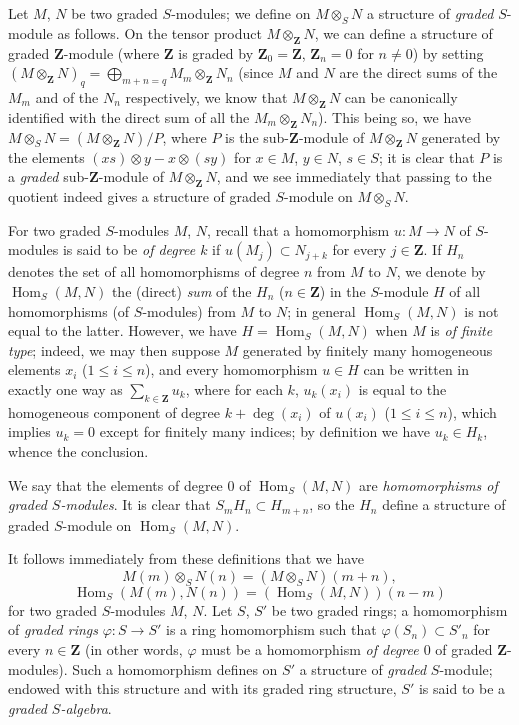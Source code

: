 \begin{env}[2.1.2]
\label{II.2.1.2}
Let $M$, $N$ be two graded $S$-modules; we define on $M\otimes_S N$ a
structure of \emph{graded} $S$-module as follows. On the tensor product
$M\otimes_{\mathbf{Z}}N$, we can define a structure of graded
$\mathbf{Z}$-module (where $\mathbf{Z}$ is graded by
$\mathbf{Z}_0=\mathbf{Z}$, $\mathbf{Z}_n=0$ for $n\ne0$) by setting $(M\otimes_{\mathbf{Z}}N)_q=\bigoplus_{m+n=q}M_m\otimes_{\mathbf{Z}}N_n$
(since $M$ and $N$ are the direct sums of the $M_m$ and of the $N_n$
respectively, we know that $M\otimes_{\mathbf{Z}}N$ can be canonically
identified with the direct sum of all the
$M_m\otimes_{\mathbf{Z}}N_n$). This being so, we have
$M\otimes_S N=(M\otimes_{\mathbf{Z}}N)/P$, where $P$ is the
sub-$\mathbf{Z}$-module of $M\otimes_{\mathbf{Z}}N$ generated by the
elements $(xs)\otimes y-x\otimes(sy)$ for $x\in M$, $y\in N$, $s\in S$;
it is clear that $P$ is a \emph{graded} sub-$\mathbf{Z}$-module of
$M\otimes_{\mathbf{Z}}N$, and we see immediately that passing to the
quotient indeed gives a structure of graded $S$-module on $M\otimes_S N$.

For two graded $S$-modules $M$, $N$, recall that a homomorphism
$u:M\to N$ of $S$-modules is said to be \emph{of degree $k$} if
$u(M_j)\subset N_{j+k}$ for every $j\in\mathbf{Z}$. If $H_n$ denotes the
set of all homomorphisms of degree $n$ from $M$ to $N$, we denote by
$\operatorname{Hom}_S(M,N)$ the (direct) \emph{sum} of the $H_n$
($n\in\mathbf{Z}$) in the $S$-module $H$ of all homomorphisms (of
$S$-modules) from $M$ to $N$; in general $\operatorname{Hom}_S(M,N)$ is not
equal to the latter. However, we have $H=\operatorname{Hom}_S(M,N)$ when
$M$ is \emph{of finite type}; indeed, we may then suppose $M$ generated by
finitely many homogeneous elements $x_i$ ($1\leq i\leq n$), and every
homomorphism $u\in H$ can be written in exactly one way as
$\sum_{k\in\mathbf{Z}}u_k$, where for each $k$, $u_k(x_i)$ is equal to the
homogeneous component of degree $k+\deg(x_i)$ of $u(x_i)$ ($1\leq i\leq n$),
which implies $u_k=0$ except for finitely many indices; by definition we
have $u_k\in H_k$, whence the conclusion.

We say that the elements of degree $0$ of $\operatorname{Hom}_S(M,N)$ are
\emph{homomorphisms of graded $S$-modules}. It is clear that
$S_mH_n\subset H_{m+n}$, so the $H_n$ define a structure of graded
$S$-module on $\operatorname{Hom}_S(M,N)$.

It follows immediately from these definitions that we have
\[
  \label{II.2.1.2.1}
  M(m)\otimes_S N(n)=(M\otimes_S N)(m+n),
  \tag{2.1.2.1}
\]
\[
  \label{II.2.1.2.2}
  \operatorname{Hom}_S(M(m),N(n))
  =(\operatorname{Hom}_S(M,N))(n-m)
  \tag{2.1.2.2}
\]
for two graded $S$-modules $M$, $N$.
Let $S$, $S'$ be two graded rings; a homomorphism of \emph{graded
rings} $\varphi:S\to S'$ is a ring homomorphism such that
$\varphi(S_n)\subset S'_n$ for every $n\in\mathbf{Z}$ (in other words,
$\varphi$ must be a homomorphism \emph{of degree $0$} of graded
$\mathbf{Z}$-modules). Such a homomorphism defines on $S'$ a structure of
\emph{graded} $S$-module; endowed with this structure and with its graded
ring structure, $S'$ is said to be a \emph{graded $S$-algebra}.


\end{env}
